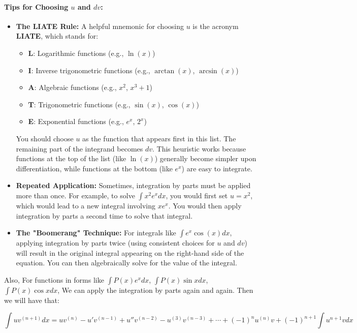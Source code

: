 \paragraph*{Tips for Choosing $u$ and $dv$:}
\begin{itemize}
    \item \textbf{The LIATE Rule:} A helpful mnemonic for choosing $u$ is the acronym \textbf{LIATE}, which stands for:
    \begin{itemize}
        \item \textbf{L}: Logarithmic functions (e.g., $\ln(x)$)
        \item \textbf{I}: Inverse trigonometric functions (e.g., $\arctan(x)$, $\arcsin(x)$)
        \item \textbf{A}: Algebraic functions (e.g., $x^2$, $x^3+1$)
        \item \textbf{T}: Trigonometric functions (e.g., $\sin(x)$, $\cos(x)$)
        \item \textbf{E}: Exponential functions (e.g., $e^x$, $2^x$)
    \end{itemize}
    You should choose $u$ as the function that appears first in this list. The remaining part of the integrand becomes $dv$. This heuristic works because functions at the top of the list (like $\ln(x)$) generally become simpler upon differentiation, while functions at the bottom (like $e^x$) are easy to integrate.

    \item \textbf{Repeated Application:} Sometimes, integration by parts must be applied more than once. For example, to solve $\int x^2 e^x dx$, you would first set $u=x^2$, which would lead to a new integral involving $x e^x$. You would then apply integration by parts a second time to solve that integral.

    \item \textbf{The "Boomerang" Technique:} For integrals like $\int e^x \cos(x) dx$, applying integration by parts twice (using consistent choices for $u$ and $dv$) will result in the original integral appearing on the right-hand side of the equation. You can then algebraically solve for the value of the integral.
\end{itemize}

Also, For functions in forms like $\int P(x) e^x dx$, $\int P(x) \sin x dx$, $\int P(x) \cos x dx$, We can apply the integration by parts again and again. Then we will have that:

\[
\int u v^{(n+1)} dx = u v^{(n)} - u'v^{(n-1)} +u''v^{(n-2)} - u^{(3)}v^{(n-3)} + \cdots + (-1)^n u^{(n)} v + (-1)^{n+1} \int u^{n+1} v dx
\]

